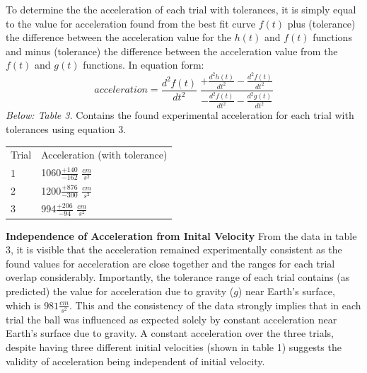 \documentclass[12pt,letterpaper]{article}
\begin{document}
To determine the the acceleration of each trial with tolerances, it is simply equal to the value for acceleration found from the best fit curve \(f(t)\) plus (tolerance) the difference between the acceleration value for the \(h(t)\) and \(f(t)\) functions and minus (tolerance) the difference between the acceleration value from the \(f(t)\) and \(g(t)\) functions. In equation form:
\begin{equation}
acceleration =\frac{d^2f(t)}{dt^2} \hspace{3pt} \frac{+\frac{d^2h(t)}{dt^2} - \frac{d^2f(t)}{dt^2}}{-\frac{d^2f(t)}{dt^2} - \frac{d^2g(t)}{dt^2}}
\end{equation}
\textit{Below: Table 3.} Contains the found experimental acceleration for each trial with tolerances using equation 3.
{\renewcommand{\arraystretch}{1.2}
\begin{table}[h]
\hspace*{1.6in}
\begin{tabular}{ll}
Trial  \hspace{.75in} & Acceleration (with tolerance)\\
\hspace{.14in}1&\hspace{.4in}1060\hspace{2pt}\(\frac{+140}{-162}\) \(\frac{cm}{s^2}\)\\
\hspace{.14in}2&\hspace{.4in}1200\hspace{2pt}\(\frac{+876}{-300}\) \(\frac{cm}{s^2}\)\\
\hspace{.14in}3&\hspace{.42in}994\hspace{2pt}\(\frac{+206}{-94}\) \(\frac{cm}{s^2}\)\\                 
\end{tabular}
\end{table}
\newline
\textbf{Independence of Acceleration from Inital Velocity}
\newline
From the data in table 3, it is visible that the acceleration remained experimentally consistent as the found values for acceleration are close together and the ranges for each trial overlap considerably. Importantly, the tolerance range of each trial contains (as predicted) the value for acceleration due to gravity (\(g\)) near Earth's surface, which is \(981 \frac{cm}{s^2}\). This and the consistency of the data strongly implies that in each trial the ball was influenced as expected solely by constant acceleration near Earth's surface due to gravity. A constant acceleration over the three trials, despite having three different initial velocities (shown in table 1) suggests the validity of acceleration being independent of initial velocity.
}
\end{document}
